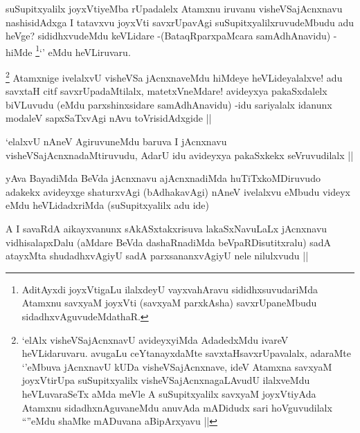 
\begin{artha}
suSupitxyalilx joyxVtiyeMba rUpadalelx Atamxnu iruvanu visheVSajAcnxnavu nashisidAdxga I tatavxvu joyxVti savxrUpavAgi suSupitxyalilxruvudeMbudu adu heVge? sididhxvudeMdu keVLidare -(BataqRparxpaMcara samAdhAnavidu) - hiMde \footnote{AditAyxdi joyxVtigaLu ilalxdeyU vayxvahAravu sididhxsuvudariMda Atamxnu savxyaM joyxVti (savxyaM parxkAsha) savxrUpaneMbudu sidadhxvAguvudeMdathaR.}`\stext' eMdu heVLiruvaru.
\end{artha}


\begin{artha}
\footnote{`elAlx visheVSajAcnxnavU avideyxyiMda AdadedxMdu ivareV heVLidaruvaru. avugaLu ceYtanayxdaMte savxtaHsavxrUpavalalx, adaraMte `\stext'eMbuva jAcnxnavU kUDa visheVSajAcnxnave, ideV Atamxna savxyaM joyxVtirUpa suSupitxyalilx visheVSajAcnxnagaLAvudU ilalxveMdu heVLuvaraSeTx aMda meVle A suSupitxyalilx savxyaM joyxVtiyAda Atamxnu sidadhxnAguvaneMdu anuvAda mADidudx sari hoVguvudilalx ``\stext''eMdu shaMke mADuvana aBipArxyavu ||}
Atamxnige ivelalxvU visheVSa jAcnxnaveMdu hiMdeye heVLideyalalxve! adu savxtaH citf savxrUpadaMtilalx, matetxVneMdare! avideyxya pakaSxdalelx biVLuvudu (eMdu parxshinxsidare samAdhAnavidu) -idu sariyalalx idanunx modaleV sapxSaTxvAgi nAvu toVrisidAdxgide ||
\end{artha}


\begin{artha}
`elalxvU nAneV AgiruvuneMdu baruva I jAcnxnavu visheVSajAcnxnadaMtiruvudu, AdarU idu avideyxya pakaSxkekx seVruvudilalx ||
\end{artha}


\begin{artha}
yAva BayadiMda BeVda jAcnxnavu ajAcnxnadiMda huTiTxkoMDiruvudo adakekx avideyxge shaturxvAgi (bAdhakavAgi) nAneV ivelalxvu eMbudu videyx eMdu heVLidadxriMda (suSupitxyalilx adu ide)
\end{artha}

\begin{artha}
A I savaRdA aikayxvanunx sAkASxtakxrisuva lakaSxNavuLaLx jAcnxnavu vidhisalapxDalu (aMdare BeVda dashaRnadiMda beVpaRDisutitxralu) sadA atayxMta shudadhxvAgiyU sadA parxsananxvAgiyU nele nilulxvudu ||
\end{artha}

